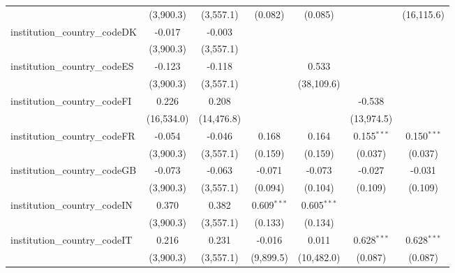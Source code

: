 \begin{tabular}{lcccccc}
                                         & (3,900.3)      & (3,557.1)      & (0.082)       & (0.085)       &                & (16,115.6)\\   
   institution\_country\_codeDK          & -0.017         & -0.003         &               &               &                &   \\   
                                         & (3,900.3)      & (3,557.1)      &               &               &                &   \\   
   institution\_country\_codeES          & -0.123         & -0.118         &               & 0.533         &                &   \\   
                                         & (3,900.3)      & (3,557.1)      &               & (38,109.6)    &                &   \\   
   institution\_country\_codeFI          & 0.226          & 0.208          &               &               & -0.538         &   \\   
                                         & (16,534.0)     & (14,476.8)     &               &               & (13,974.5)     &   \\   
   institution\_country\_codeFR          & -0.054         & -0.046         & 0.168         & 0.164         & 0.155$^{***}$  & 0.150$^{***}$\\   
                                         & (3,900.3)      & (3,557.1)      & (0.159)       & (0.159)       & (0.037)        & (0.037)\\   
   institution\_country\_codeGB          & -0.073         & -0.063         & -0.071        & -0.073        & -0.027         & -0.031\\   
                                         & (3,900.3)      & (3,557.1)      & (0.094)       & (0.104)       & (0.109)        & (0.109)\\   
   institution\_country\_codeIN          & 0.370          & 0.382          & 0.609$^{***}$ & 0.605$^{***}$ &                &   \\   
                                         & (3,900.3)      & (3,557.1)      & (0.133)       & (0.134)       &                &   \\   
   institution\_country\_codeIT          & 0.216          & 0.231          & -0.016        & 0.011         & 0.628$^{***}$  & 0.628$^{***}$\\   
                                         & (3,900.3)      & (3,557.1)      & (9,899.5)     & (10,482.0)    & (0.087)        & (0.087)\\   

\end{tabular}
